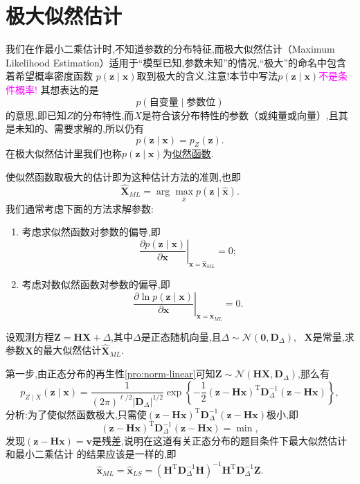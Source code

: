 \documentclass[cn,10pt,citestyle=gb7714-2015,bibstyle=gb7714-2015]{elegantbook}
\newcommand{\mT}{\mathrm{T}}
\renewcommand{\l}{\ell}
\begin{document}
\section{极大似然估计}
我们在作最小二乘估计时,不知道参数的分布特征,而极大似然估计（Maximum Likelihood Estimation）适用于“模型已知,参数未知”的情况,“极大”的命名中包含着希望概率密度函数
$p(\bm{z}\mid \bm{x})$取到极大的含义,注意!本节中写法$p(\bm{z}\mid \bm{x})$\textcolor{magenta}{不是条件概率!}
其想表达的是
\[
    p(\textbf{自变量}\mid \textbf{参数位})
\]
的意思,即已知$Z$的分布特性,而$X$是符合该分布特性的参数（或纯量或向量）,且其是未知的、需要求解的,所以仍有
\[
  p(\bm{z}\mid \bm{x})=p_Z(\bm{z}).
\]
在极大似然估计里我们也称$p(\bm{z}\mid \bm{x})$为\uline{似然函数}.
\begin{theorem}[极大似然准则]\label{thm:MLE-principle}
使似然函数取极大的估计即为这种估计方法的准则,也即
\begin{equation}\label{eq:ML-solution}
  \hat{\bm{X}}_{ML}=\arg\max_{\hat{x}}p(\bm{z}\mid \hat{\bm{x}}).
\end{equation}
我们通常考虑下面的方法求解参数:
\begin{enumerate}
  \item 考虑求似然函数对参数的偏导,即
  \begin{equation}
    \left.\frac{\partial p(\bm{z}\mid \bm{x})}{\partial \bm{x}}\right|_{\bm{x}=\hat{\bm{x}}_{ML}}=0;
  \end{equation}
  \item 考虑对数似然函数对参数的偏导,即
  \begin{equation}
    \left.\frac{\partial\ln p(\bm{z}\mid \bm{x})}{\partial \bm{x}}\right|_{\bm{x}=\hat{\bm{x}}_{ML}}=0.
  \end{equation}
\end{enumerate}
\end{theorem}
\begin{example}
  设观测方程$\bm{Z}=\bm{H}\bm{X}+\bm{\varDelta}$,其中$\bm{\varDelta}$是正态随机向量,且$\bm{\varDelta}\sim\mathcal{N}(\bm{0},\bm{D}_{\bm{\varDelta}})$,
  \ $\bm{X}$是常量,求参数$\bm{X}$的最大似然估计$\hat{\bm{X}}_{ML}$.
\end{example}
\begin{solution}
  第一步,由正态分布的再生性\ref{pro:norm-linear}可知$\bm{Z}\sim\mathcal{N}(\bm{H}\bm{X},\bm{D}_{\bm{\varDelta}})$,那么有
  \[
      p_{Z\mid X}(\bm{z}\mid \bm{x})=\frac{1}{(2\pi)^{\l/2}|\bm{D}_{\bm{\varDelta}}|^{1/2}}\exp\left\{-\frac12(\bm{z}-\bm{H}\bm{x})^\mT\bm{D}_{\bm{\varDelta}}^{-1}(\bm{z}-\bm{H}\bm{x})\right\},
  \]
  分析:为了使似然函数极大,只需使$(\bm{z}-\bm{H}\bm{x})^\mT\bm{D}_{\bm{\varDelta}}^{-1}(\bm{z}-\bm{H}\bm{x})$极小,即
  \[
    (\bm{z}-\bm{H}\bm{x})^\mT\bm{D}_{\bm{\varDelta}}^{-1}(\bm{z}-\bm{H}\bm{x})=\min,
  \]
  发现$(\bm{z}-\bm{H}\bm{x})=\bm{v}$是残差,说明在这道有关正态分布的题目条件下最大似然估计和最小二乘估计
  的结果应该是一样的,即
  \[
      \hat{\bm{x}}_{ML}=\hat{\bm{x}}_{LS}=(\bm{H}^\mT\bm{D}^{-1}_{\bm{\varDelta}}\bm{H})^{-1}\bm{H}^\mT\bm{D}_{\bm{\varDelta}}^{-1}\bm{Z}.
  \]
\end{solution}
\end{document}
